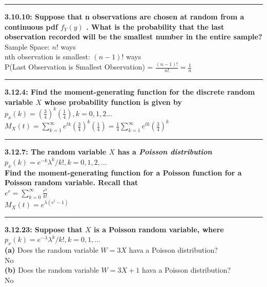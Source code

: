 \documentclass[11pt]{article}
\newcommand\question[2]{\vspace{.25in}\hrule\textbf{#1: #2}\vspace{.5em}\vspace{.10in}}
\renewcommand\part[1]{\vspace{.10in}\textbf{(#1)}}
\begin{document}
\question{3.10.10}
{Suppose that n observations are chosen at random from a continuous pdf
$f_{Y}(y)$
. What is the probability that the last observation recorded will be the smallest
number in the entire sample?}
\\
Sample Space: $n!$ ways
\\
nth observation is smallest: $(n-1)!$ ways
\\
P(Last Observation is Smallest Observation) = $\frac{(n-1)!}{n!} = \frac{1}{n}$




\question{3.12.4}
{Find the moment-generating function for the discrete random variable $X$
whose probability function is given by
$p_{x}(k) = (\frac{3}{4})^{k}(\frac{1}{4}), k = 0,1,2...$}
\\
$
M_{X}(t) 
= 
\sum_{k=1}^{\infty} e^{tk}(\frac{3}{4})^{k}(\frac{1}{4})
=
\frac{1}{4} \sum_{k=1}^{\infty} e^{tk}(\frac{3}{4})^{k}
$


\question{3.12.7}
{The random variable $X$ has a \emph{Poisson distribution}
$p_{x}(k) = e^{-k}\lambda ^{k}/k!, k=0,1,2,...$
\\
Find the moment-generating function for a Poisson function for a Poisson
random variable. Recall that
\\
$e^{r}=\sum_{k=0}^{\infty}\frac{r^{k}}{k!}$}
\\
$
M_{X}(t) 
= 
e^{\lambda(e^{t}-1)}
$




\question{3.12.23}
{Suppose that $X$ is a Poisson random variable, where
$p_{x}(k) = e^{-\lambda}\lambda^{k}/k!,k=0,1,...$}
\\
\part{a}
{Does the random variable $W = 3X$ hava a Poisson distribution?}
\\ 
No
\\
\part{b}
{Does the random variable $W = 3X+1$ hava a Poisson distribution?}
\\
No
\end{document}
